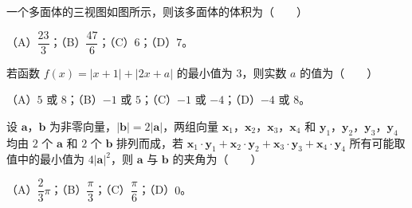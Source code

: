 \begin{question}
一个多面体的三视图如图所示，则该多面体的体积为\mbox{（　　）}

（A）$\dfrac{23}3$；（B）$\dfrac{47}6$；（C）$6$；（D）$7$。
\nopagebreak[4]
\begin{center}\end{center}
\nopagebreak[4]
\end{question}
\begin{question}
若函数 $f(x)=|x+1|+|2x+a|$ 的最小值为 $3$，则实数 $a$ 的值为\mbox{（　　）}

（A）$5$ 或 $8$；（B）$-1$ 或 $5$；（C）$-1$ 或 $-4$；（D）$-4$ 或 $8$。

\end{question}
\begin{question}
设 $\boldsymbol a$，$\boldsymbol b$ 为非零向量，$|\boldsymbol b|=2|\boldsymbol a|$，两组向量 $\boldsymbol x_1$，$\boldsymbol x_2$，$\boldsymbol x_3$，$\boldsymbol x_4$ 和 $\boldsymbol y_1$，$\boldsymbol y_2$，$\boldsymbol y_3$，$\boldsymbol y_4$ 均由 $2$ 个 $\boldsymbol a$ 和 $2$ 个 $\boldsymbol b$ 排列而成，若 $\boldsymbol x_1\cdot\boldsymbol y_1+\boldsymbol x_2\cdot\boldsymbol y_2+\boldsymbol x_3\cdot\boldsymbol y_3+\boldsymbol x_4\cdot\boldsymbol y_4$ 所有可能取值中的最小值为 $4|\boldsymbol a|^2$，则 $\boldsymbol a$ 与 $\boldsymbol b$ 的夹角为\mbox{（　　）}

（A）$\dfrac23\pi$；（B）$\dfrac\pi3$；（C）$\dfrac\pi6$；（D）$0$。

\end{question}

